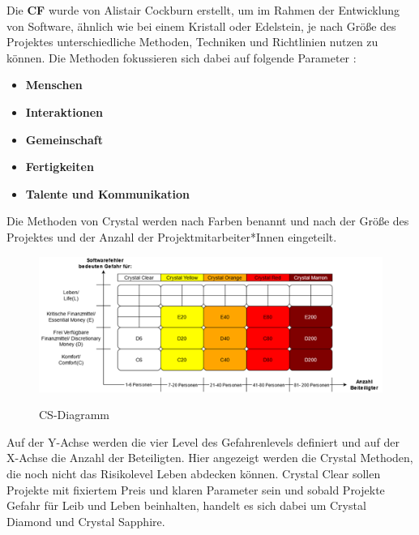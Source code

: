 Die \textbf{CF} wurde von Alistair Cockburn erstellt, um im Rahmen der Entwicklung von Software, ähnlich wie bei einem Kristall oder Edelstein, 
je nach Größe des Projektes unterschiedliche Methoden, Techniken und Richtlinien nutzen zu können. Die Methoden fokussieren sich 
dabei auf folgende Parameter \cite{Ibrahim2020-ip}:
\begin{itemize}
    \item \textbf{Menschen}
    \item \textbf{Interaktionen} 
    \item \textbf{Gemeinschaft}    
    \item \textbf{Fertigkeiten}
    \item \textbf{Talente und Kommunikation }
\end{itemize}
Die Methoden von Crystal werden nach Farben benannt und nach der Größe des Projektes und der Anzahl der Projektmitarbeiter*Innen eingeteilt.
\begin{figure}[h!]
    \centering
    \caption{CS-Diagramm}
        \includegraphics[width=1\textwidth]{fig/CSD.png}
        \label{fig:CS-diagram}
    \end{figure}
Auf der Y-Achse werden die vier Level des Gefahrenlevels definiert und auf der X-Achse die Anzahl der Beteiligten. 
Hier angezeigt werden die Crystal Methoden, die noch nicht das Risikolevel Leben abdecken können. 
Crystal Clear sollen Projekte mit fixiertem Preis und klaren Parameter sein und sobald Projekte Gefahr für Leib 
und Leben beinhalten, handelt es sich dabei um Crystal Diamond und Crystal Sapphire.\cite{cockburn2004,Ibrahim2020-ip} \\

